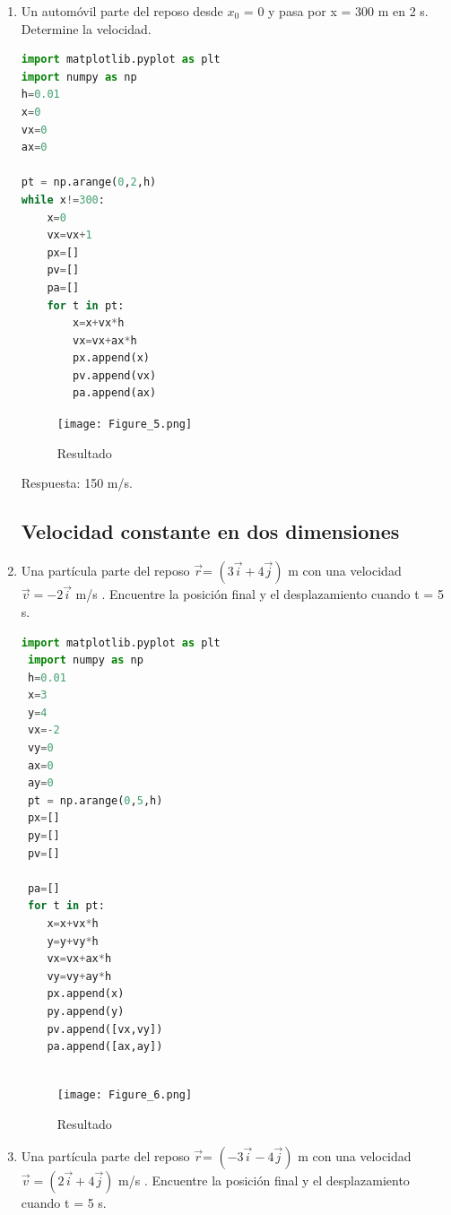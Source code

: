\documentclass{article}
\begin{document}
\begin{flushleft}
\begin{enumerate}
    \item  Un automóvil parte del reposo desde $x_0$ = 0 y pasa por x = 300 m en 2 s. Determine la velocidad.\\
    \begin{lstlisting}[language=Python,caption=Ejercicio 4]
import matplotlib.pyplot as plt
import numpy as np
h=0.01
x=0
vx=0
ax=0

pt = np.arange(0,2,h)
while x!=300:
    x=0
    vx=vx+1
    px=[]
    pv=[]
    pa=[]
    for t in pt:
        x=x+vx*h
        vx=vx+ax*h
        px.append(x)
        pv.append(vx)
        pa.append(ax)
    \end{lstlisting}
    
     \begin{figure}[H]
    \centering
    \texttt{[image: Figure\_5.png]}
    \caption{Resultado}
    \end{figure}
    
    Respuesta: 150 m/s.
    
    \subsection{Velocidad constante en dos dimensiones}
 
        \item Una partícula parte del reposo $\vec{r}$= $(3\vec{i}+4\vec{j})$ m con una velocidad  $\vec{v}=-2\vec{i} $ m/s . Encuentre la posición final y el desplazamiento cuando t = 5 s.
        
         \begin{lstlisting}[language=Python,caption=Ejercicio 1]
 import matplotlib.pyplot as plt
 import numpy as np
 h=0.01
 x=3
 y=4
 vx=-2
 vy=0
 ax=0
 ay=0
 pt = np.arange(0,5,h)
 px=[]
 py=[]
 pv=[]
    
 pa=[]
 for t in pt:
    x=x+vx*h
    y=y+vy*h
    vx=vx+ax*h
    vy=vy+ay*h
    px.append(x)
    py.append(y)
    pv.append([vx,vy])
    pa.append([ax,ay])      
                     
          \end{lstlisting}
       
     

    \begin{figure}[H]
    \centering
    \texttt{[image: Figure\_6.png]}
    \caption{Resultado}
    \end{figure}
    
    \item Una partícula parte del reposo $\vec{r}$= $(-3\vec{i}-4\vec{j})$ m con una velocidad  $\vec{v}=(2\vec{i} + 4\vec{j}) $ m/s . Encuentre la posición final y el desplazamiento cuando t = 5 s.
    

\end{enumerate}
\end{flushleft}
\end{document}
